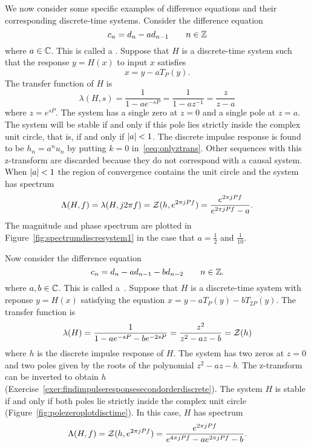 We now consider some specific examples of difference equations and their corresponding discrete-time systems.  Consider the difference equation
\begin{equation}\label{eq:firstorderdifferenceequation}
c_n = d_n - a d_{n-1} \qquad n \in {\mathbb Z}
\end{equation}
where $a \in {\mathbb C}$.  This is called a .  Suppose that $H$ is a discrete-time system such that the response $y = H(x)$ to input $x$ satisfies
\[
x = y - a T_{P}(y).
\]
The transfer function of $H$ is
\[
\lambda(H,s) = \frac{1}{1 - a e^{-sP}} = \frac{1}{1 - a z^{-1}} = \frac{z}{z - a}
\]
where $z = e^{sP}$.  The system has a single zero at $z=0$ and a single pole at $z = a$.  The system will be stable if and only if this pole lies strictly inside the complex unit circle, that is, if and only if $\left\vert a \right\vert < 1$.  The discrete impulse response is found to be $h_n = a^n u_n$ by putting $k=0$ in~\eqref{eeq:onlyztrans}.  Other sequences with this z-transform are discarded because they do not correspond with a causal system.  %
When $\left\vert a \right\vert < 1$ the region of convergence contains the unit circle and the system has spectrum
\[
\Lambda(H,f) = \lambda(H,j2\pi f) = {\mathcal Z}(h, e^{2\pi j P f}) = \frac{e^{2\pi j P f}}{e^{2\pi j P f} - a}.
\]
The magnitude and phase spectrum are plotted in Figure~\ref{fig:spectrumdiscresystem1} in the case that $a = \tfrac{1}{2}$ and $\tfrac{1}{10}$.

Now consider the difference equation
\[
c_n = d_n - a d_{n-1} - b d_{n-2} \qquad n \in {\mathbb Z}.
\]
where $a,b \in {\mathbb C}$.  This is called a~.  Suppose that $H$ is a discrete-time system with reponse $y=H(x)$ satisfying the equation $x = y - aT_{P}(y) - b T_{2P}(y)$.  The transfer function is
\[
\lambda(H) = \frac{1}{1 - a e^{-sP} - b e^{-2sP}} = \frac{z^2}{z^2 - a z - b} = {\mathcal Z}(h)
\]
where $h$ is the discrete impulse response of $H$.  The system has two zeros at $z = 0$ and two poles given by the roots of the polynomial $z^2 - a z - b$.  The z-transform can be inverted to obtain $h$ (Exercise~\ref{exer:findimpulseresponsesecondorderdiscrete}).  The system $H$ is stable if and only if both poles lie strictly inside the complex unit circle (Figure~\ref{fig:polezeroplotdisctime}).  In this case, $H$ has spectrum
\[
\Lambda(H,f) = {\mathcal Z}(h, e^{2\pi j P f}) = \frac{e^{2\pi jP f}}{e^{4\pi jP f} - a e^{2\pi jP f} - b}.
\]

